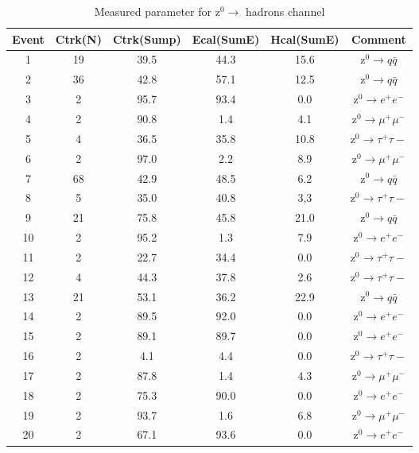 \begin{table*}[htbp]
	\centering
	
	\begin{tabular}{ccc ccc}
		\toprule
		Event & Ctrk(N) & Ctrk(Sump) & Ecal(SumE) & Hcal(SumE) & Comment \\
		\midrule

1& 19& 39.5&44.3&15.6 & $ \text{z}^0\rightarrow q\bar{q}$\\
2& 36& 42.8&57.1&12.5& $ \text{z}^0\rightarrow q \bar{q}$\\
3& 2& 95.7& 93.4&0.0& $ \text{z}^0\rightarrow e^+e^- $\\
4& 2& 90.8&1.4&4.1& $ \text{z}^0\rightarrow \mu^+\mu^- $\\
5& 4& 36.5&35.8&10.8& $ \text{z}^0\rightarrow \tau^+\tau-$\\
6& 2& 97.0&2.2&8.9& $ \text{z}^0\rightarrow \mu^+\mu^- $\\
7& 68& 42.9&48.5&6.2& $ \text{z}^0\rightarrow q\bar{q}$\\
8& 5& 35.0&40.8&3,3& $ \text{z}^0\rightarrow \tau^+\tau-$\\
9& 21& 75.8&45.8&21.0&$ \text{z}^0\rightarrow q \bar{q}$\\
10& 2& 95.2&1.3&7.9& $ \text{z}^0\rightarrow e^+e^- $\\
11& 2& 22.7&34.4&0.0& $ \text{z}^0\rightarrow \tau^+\tau-$\\
12& 4& 44.3&37.8&2.6& $ \text{z}^0\rightarrow \tau^+\tau-$\\
13& 21& 53.1&36.2&22.9& $ \text{z}^0\rightarrow q\bar{q}$\\
14& 2& 89.5&92.0&0.0& $ \text{z}^0\rightarrow e^+e^- $\\
15& 2& 89.1&89.7&0.0& $ \text{z}^0\rightarrow e^+e^- $\\
16& 2& 4.1&4.4&0.0& $ \text{z}^0\rightarrow \tau^+\tau-$\\
17& 2& 87.8&1.4&4.3& $ \text{z}^0\rightarrow \mu^+\mu^- $\\
18& 2& 75.3&90.0&0.0& $ \text{z}^0\rightarrow e^+e^- $\\
19& 2& 93.7&1.6&6.8& $ \text{z}^0\rightarrow \mu^+\mu^- $\\
20& 2& 67.1&93.6&0.0& $ \text{z}^0\rightarrow e^+e^- $\\
\bottomrule
\end{tabular}
\caption{Measured parameter for $ \text{z}^0\rightarrow $ hadrons channel}
\label{tab:test1}
\end{table*}
